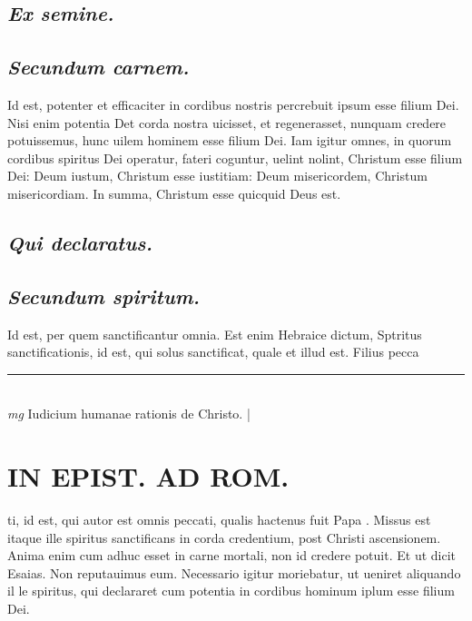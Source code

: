 \documentclass{article}
\begin{document}
\begin{pages}
\subsection*{\textit{Ex semine. }}
{}
\subsection*{\textit{Secundum carnem. }}\pstart Id est, potenter et efficaciter in cordibus nostris percrebuit ipsum esse filium Dei. Nisi enim potentia Det corda nostra uicisset, et regenerasset, nunquam credere potuissemus, hunc uilem hominem esse filium Dei. Iam igitur omnes, in quorum cordibus spiritus Dei operatur, fateri coguntur, uelint nolint, Christum esse filium Dei: Deum iustum, Christum esse iustitiam: Deum misericordem, Christum misericordiam.  In summa, Christum esse quicquid Deus est.   \pend
{}
{}
\subsection*{\textit{Qui declaratus. }}
{}
\subsection*{\textit{Secundum spiritum. }}\pstart Id est, per quem sanctificantur omnia. Est enim Hebraice dictum, Sptritus sanctificationis, id est, qui solus sanctificat, quale et illud est. Filius pecca\pend
\vspace{0.5cm}\noindent
\vspace{0.2cm}\rule{1cm}{0.2pt}\\ 
\hspace{0.2cm}\textit{mg}
\footnotesize Iudicium humanae rationis de Christo.  
\normalsize| 
\section*{IN EPIST. AD ROM.  }
\marginpar{[ p.6 ]}\pstart ti, id est, qui autor est omnis peccati, qualis hactenus fuit Papa . Missus est itaque ille spiritus sanctificans in corda credentium, post Christi ascensionem. Anima enim cum adhuc esset in carne mortali, non id credere potuit. Et ut dicit Esaias. Non reputauimus eum.  Necessario igitur moriebatur, ut ueniret aliquando il le spiritus, qui declararet cum potentia in cordibus hominum iplum esse filium Dei.   \pend
{}
{}

\end{pages}
\end{document}
